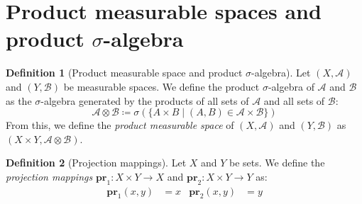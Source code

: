 \documentclass{article}
\newtheorem{theorem}{Theorem}[section]
\theoremstyle{definition}
\newtheorem{definition}{Definition}[section]
\theoremstyle{remark}
\theoremstyle{example}
\theoremstyle{notation}
\theoremstyle{axiom}
\newcommand{\E}[1]{\mathbb{E}[#1]}
\newcommand{\V}[1]{\mathbb{V}[#1]}
\newcommand{\pr}{\mathbf{pr}}
\begin{document}



\section{Product measurable spaces and product $\sigma$-algebra}

\begin{definition}[Product measurable space and product $\sigma$-algebra] %
		Let $(X, \mathcal{A})$ and $(Y, \mathcal{B})$ be measurable spaces. We define the product $\sigma$-algebra of $\mathcal{A}$ and $\mathcal{B}$ as the $\sigma$-algebra generated by the products of all sets of $\mathcal{A}$ and all sets of $\mathcal{B}$:
				$$\mathcal{A} \otimes \mathcal{B} \coloneq \sigma(\{A \times B \mid (A, B) \in \mathcal{A} \times \mathcal{B}\})$$
		From this, we define the \textit{product measurable space} of $(X, \mathcal{A})$ and $(Y, \mathcal{B})$ as $(X \times Y, \mathcal{A} \otimes \mathcal{B})$.
\end{definition}

\begin{definition}[Projection mappings]
		Let $X$ and $Y$ be sets. We define the \textit{projection mappings} $\pr_1 : X \times Y \rightarrow X$ and $\pr_2 : X \times Y \rightarrow Y$ as:
		\begin{align*}
				\pr_1(x, y) &= x & \pr_2(x, y) &= y
		\end{align*}
\end{definition}
\end{document}
